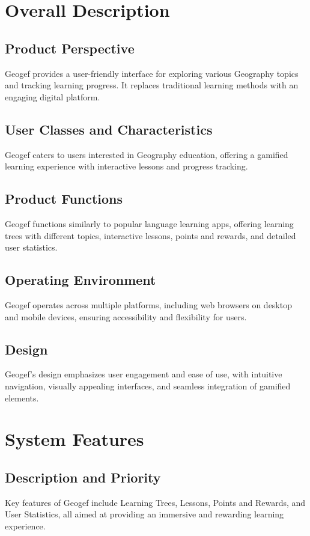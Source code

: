 \documentclass{scrreprt}
\begin{document}
\chapter{Overall Description}

\section{Product Perspective}
Geogef provides a user-friendly interface for exploring various Geography topics and tracking learning progress. It replaces traditional learning methods with an engaging digital platform.

\section{User Classes and Characteristics}
Geogef caters to users interested in Geography education, offering a gamified learning experience with interactive lessons and progress tracking.

\section{Product Functions}
Geogef functions similarly to popular language learning apps, offering learning trees with different topics, interactive lessons, points and rewards, and detailed user statistics.

\section{Operating Environment}
Geogef operates across multiple platforms, including web browsers on desktop and mobile devices, ensuring accessibility and flexibility for users.

\section{Design}
Geogef's design emphasizes user engagement and ease of use, with intuitive navigation, visually appealing interfaces, and seamless integration of gamified elements.

\chapter{System Features}

\section{Description and Priority}
Key features of Geogef include Learning Trees, Lessons, Points and Rewards, and User Statistics, all aimed at providing an immersive and rewarding learning experience.
\end{document}
